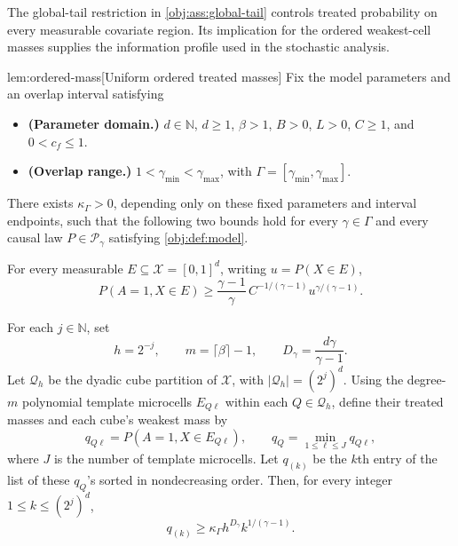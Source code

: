 \documentclass[11pt]{article}
\begin{document}
The global-tail restriction in \cref{obj:ass:global-tail} controls treated probability on every measurable covariate region. Its implication for the ordered weakest-cell masses supplies the information profile used in the stochastic analysis.

\begin{lemmav}{lem:ordered-mass}[Uniform ordered treated masses]
Fix the model parameters and an overlap interval satisfying
\begin{itemize}
\item \textbf{(Parameter domain.)} \(d\in\mathbb N\), \(d\ge1\), \(\beta>1\), \(B>0\), \(L>0\), \(C\ge1\), and \(0<c_f\le1\).
\item \textbf{(Overlap range.)} \(1<\gamma_{\min}<\gamma_{\max}\), with \(\Gamma=[\gamma_{\min},\gamma_{\max}]\).
\end{itemize}
There exists \(\kappa_\Gamma>0\), depending only on these fixed parameters and interval endpoints, such that the following two bounds hold for every \(\gamma\in\Gamma\) and every causal law \(P\in\mathcal P_\gamma\) satisfying \cref{obj:def:model}.

For every measurable \(E\subseteq\mathcal X=[0,1]^d\), writing \(u=P(X\in E)\),
\[
P(A=1,X\in E)
\ge
\frac{\gamma-1}{\gamma}\,
C^{-1/(\gamma-1)}u^{\gamma/(\gamma-1)}.
\]

For each \(j\in\mathbb N\), set
\[
h=2^{-j},\qquad
m=\lceil\beta\rceil-1,\qquad
D_\gamma=\frac{d\gamma}{\gamma-1}.
\]
Let \(\mathcal Q_h\) be the dyadic cube partition of \(\mathcal X\), with \(|\mathcal Q_h|=(2^j)^d\). Using the degree-\(m\) polynomial template microcells \(E_{Q\ell}\) within each \(Q\in\mathcal Q_h\), define their treated masses and each cube's weakest mass by
\[
q_{Q\ell}=P(A=1,X\in E_{Q\ell}),
\qquad
q_Q=\min_{1\le\ell\le J}q_{Q\ell},
\]
where \(J\) is the number of template microcells. Let \(q_{(k)}\) be the \(k\)th entry of the list of these \(q_Q\)'s sorted in nondecreasing order. Then, for every integer \(1\le k\le(2^j)^d\),
\[
q_{(k)}
\ge
\kappa_\Gamma h^{D_\gamma}k^{1/(\gamma-1)}.
\]
\end{lemmav}
\end{document}
